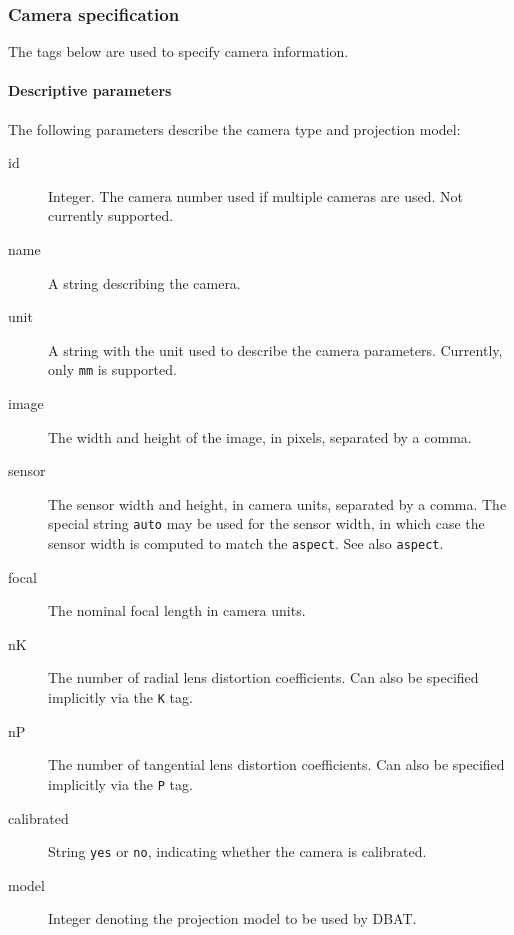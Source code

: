 \documentclass{article}
\begin{document}
\subsubsection{Camera specification}
\label{sec:camSpec}
The tags below are used to specify camera information. 
\paragraph{Descriptive parameters}
\label{sec:org76400b5}
The following parameters describe the camera type and projection
model:
\begin{description}
\item[{id}] Integer. The camera number used if multiple cameras are used.
Not currently supported.
\item[{name}] A string describing the camera.
\item[{unit}] A string with the unit used to describe the camera
parameters. Currently, only \texttt{mm} is supported.
\item[{image}] The width and height of the image, in pixels, separated by
a comma.
\item[{sensor}] The sensor width and height, in camera units, separated by
a comma. The special string \texttt{auto} may be used for the
sensor width, in which case the sensor width is computed
to match the \texttt{aspect}. See also \texttt{aspect}.
\item[{focal}] The nominal focal length in camera units.
\item[{nK}] The number of radial lens distortion coefficients. Can also be
specified implicitly via the \texttt{K} tag.
\item[{nP}] The number of tangential lens distortion coefficients. Can
also be specified implicitly via the \texttt{P} tag.
\item[{calibrated}] String \texttt{yes} or \texttt{no}, indicating whether the camera
is calibrated.
\item[{model}] Integer denoting the  projection model to be used by DBAT.
\end{description}
\end{document}
